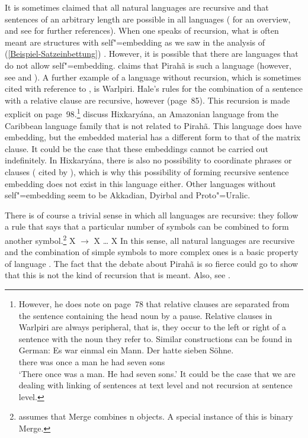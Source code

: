 \addlines
It is sometimes claimed that all natural languages are recursive and that sentences of an arbitrary
length are possible in all languages (\citealp*[]{HNG2005a} for an overview, and see  for further references). When one speaks of recursion,
what is often meant are structures with self"=embedding as we saw in the analysis of (\ref{Beispiel-Satzeinbettung}) \citep{Fitch2010a}. 
However, it is possible that there are languages that do not allow self"=embedding. \citet{Everett2005a-u} claims that
Pirah{\~a} is such a language (however, see  and
). 
A further example of a language without recursion, which is sometimes cited with reference to , is Warlpiri.
Hale's rules for the combination of a sentence with a relative clause are recursive, however (page~85). This recursion is made
explicit on page~98.\footnote{%
	However, he does note on page~78 that relative clauses are separated from the sentence
        containing the head noun by a pause. Relative clauses in Warlpiri are always peripheral, that is, they occur to the left or right of a sentence with the noun they refer to. Similar
	constructions can be found in German:
\ea
\gll Es war einmal ein Mann. Der hatte sieben Söhne.\\
	 there was once a man he had seven sons\\
\glt `There once was a man. He had seven sons.'
\z
It could be the case that we are dealing with linking of sentences at text level and not recursion at sentence level.
} \citet[]{PS2010a} discuss Hixkaryána, an Amazonian language from the Caribbean language
family that is not related to Pirah{\~a}. This language does have embedding, but the embedded
material has a different form to that of the matrix clause. It could be the case that these embeddings cannot be carried out indefinitely. In Hixkaryána,
there is also no possibility to coordinate phrases or clauses ( cited by ), which is why this possibility of forming recursive sentence embedding does not
exist in this language either. Other languages without self"=embedding seem to be Akkadian, Dyirbal and Proto"=Uralic.
	
There is of course a trivial sense in which all languages are recursive: they follow a rule that says that a particular number of symbols can be combined
to form another symbol.\footnote{
  \citet[]{Chomsky2005a} assumes that Merge combines n objects. A special instance of this is binary Merge.
}
\ea
X $\to$ X \ldots{} X
\z
In this sense, all natural languages are recursive and the combination of simple symbols to more complex ones is a basic property of language \citep[]{Hockett60a}. The fact that the debate about Pirah{\~a} is so fierce could go to show that this is not the kind of recursion that is meant.
Also, see \citet{Fitch2010a}.


